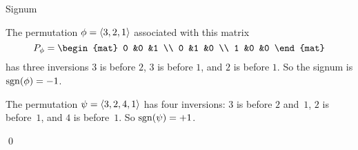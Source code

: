 \documentclass[10pt,t]{beamer}
\begin{document}
\begin{frame}{Signum}
\df[df:Signum]

\pause
\ex The permutation
$\phi=\langle3,2,1\rangle$
associated with this matrix 
\begin{equation*}
  P_{\phi}=
  \begin{mat}
    0 &0 &1 \\
    0 &1 &0 \\
    1 &0 &0
  \end{mat}
\end{equation*}
has three inversions
$3$ is before $2$, $3$ is before $1$, and 
$2$ is before $1$.
So the signum is $\operatorname{sgn}(\phi)=-1$.

\pause
\ex
The permutation $\psi=\langle3,2,4,1\rangle$
has four inversions: $3$ is before $2$ and~$1$,
$2$ is before~$1$, and $4$ is before~$1$.
So $\operatorname{sgn}(\psi)=+1$.
\end{frame}




\begin{frame}

\pause
\pf
{}
\qed
\end{frame}
\end{document}
